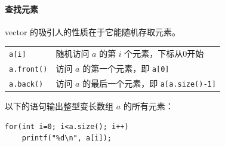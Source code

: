 \documentclass[UTF8]{ctexart}
\newcommand\Emph[1]{\colorbox{green!10}{\textcolor{green!30!black}{#1}}}
\begin{document}
\BgThispage

\paragraph{查找元素} vector 的吸引人的性质在于它能\Emph{随机存取}元素。
\begin{table}[H]
  \centering
  \begin{tabular}{ll}
  \verb!a[i]! & 随机访问 $a$ 的第 $i$ 个元素，下标从0开始 \\
  \verb!a.front()! & 访问 $a$ 的第一个元素，即 \verb!a[0]! \\
  \verb!a.back()! & 访问 $a$ 的最后一个元素，即 \verb!a[a.size()-1]! \\
  \end{tabular}
\end{table}

以下的语句输出整型变长数组 $a$ 的所有元素：
\begin{lstlisting}[numbers=none]
for(int i=0; i<a.size(); i++)
    printf("%d\n", a[i]);
\end{lstlisting}
\end{document}
